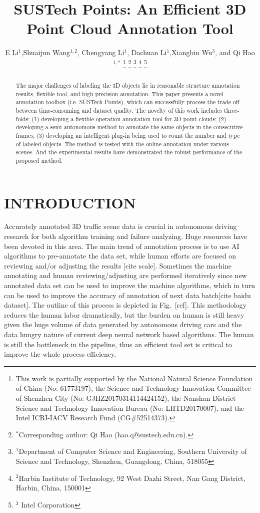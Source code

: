 \documentclass[letterpaper, 10 pt, conference]{ieeeconf}  %
\title{\LARGE \bf
SUSTech Points: An Efficient 3D Point Cloud Annotation Tool
}
\author{E Li$^{1}$,Shuaijun Wang$^{1,2}$,  Chengyang Li$^{1}$, Dachuan Li$^{1}$,Xiangbin Wu$^{3}$, and Qi Hao$^{1,*}$%
\thanks{This work is partially supported by the National Natural Science Foundation of China (No: 61773197), the Science and Technology Innovation Committee of Shenzhen City (No: GJHZ20170314114424152), the Nanshan District Science and Technology Innovation Bureau (No: LHTD20170007), and the Intel ICRI-IACV Research Fund (CG$\#$52514373).}
\thanks{$^{*}$Corresponding author: Qi Hao (hao.q@sustech.edu.cn).}
\thanks{$^{1}$Department of Computer Science and Engineering,
Southern University of Science and Technology, Shenzhen, Guangdong, China, 518055}
\thanks{$^{2}$Harbin Institute of Technology,
92 West Dazhi Street, Nan Gang District, Harbin, China, 150001}%
\thanks{$^{3}$ Intel Corporation}%
}
\begin{document}
\maketitle
\thispagestyle{empty}
\pagestyle{empty}
\begin{abstract}
The major challenges of labeling the 3D objects lie in reasonable structure annotation results, flexible tool, and high-precision annotation. This paper presents a novel annotation toolbox (i.e. SUSTech Points), which can successfully process the trade-off between time-consuming and dataset quality. The novelty of this work includes three-folds: (1) developing a flexible operation annotation tool for 3D point clouds; (2) developing a semi-autonomous method to annotate the same objects in the consecutive frames; (3) developing an intelligent plug-in being used to count the number and type of labeled objects. The method is tested with the online annotation under various scenes. And the experimental results have demonstrated the robust performance of the proposed method.
\end{abstract}






\section{INTRODUCTION}

Accurately annotated 3D traffic scene data  is  crucial in autonomous driving research for both algorithm training and failure analyzing. Huge resources have been devoted in this area. 
The main trend of annotation process is to use AI algorithms to pre-annotate the data set, while human efforts are focused on reviewing and/or adjusting the results [cite scale]. 
Sometimes the machine annotating and human reviewing/adjusting are performed iteratively since new annotated data set can be used to improve the machine algorithms, which in turn can be used to improve the accuracy of annotation of next data batch[cite baidu dataset]. The outline of this process is depicted in Fig.~[ref].   
This methodology reduces the human labor dramatically, but the burden on human is still heavy given the huge volume of data generated by autonomous driving cars and the data hungry nature of current deep neural network based algorithms. The human is still the bottleneck in the pipeline, thus an efficient tool set is critical to improve the whole process efficiency.
\end{document}
